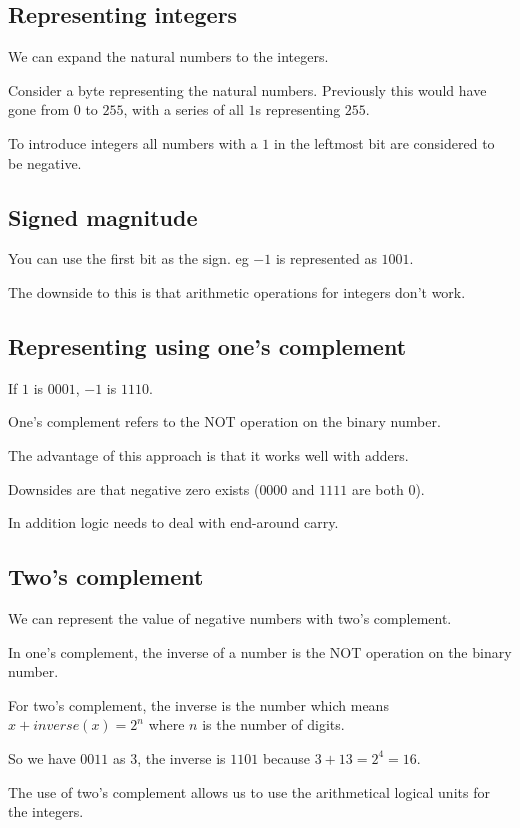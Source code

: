 
\subsection{Representing integers}

We can expand the natural numbers to the integers.

Consider a byte representing the natural numbers. Previously this would have gone from \(0\) to \(255\), with a series of all \(1\)s representing \(255\).

To introduce integers all numbers with a \(1\) in the leftmost bit are considered to be negative.


\subsection{Signed magnitude}

You can use the first bit as the sign. eg \(-1\) is represented as \(1001\).

The downside to this is that arithmetic operations for integers don't work.

\subsection{Representing using one's complement}

If \(1\) is \(0001\), \(-1\) is \(1110\).

One's complement refers to the NOT operation on the binary number.

The advantage of this approach is that it works well with adders.

Downsides are that negative zero exists (\(0000\) and \(1111\) are both \(0\)).

In addition logic needs to deal with end-around carry.

\subsection{Two's complement}

We can represent the value of negative numbers with two’s complement. 

In one's complement, the inverse of a number is the NOT operation on the binary number.

For two's complement, the inverse is the number which means \(x + inverse(x) = 2^n\) where \(n\) is the number of digits.

So we have \(0011\) as \(3\), the inverse is \(1101\) because \(3+13=2^4=16\).

The use of two’s complement allows us to use the arithmetical logical units for the integers.

